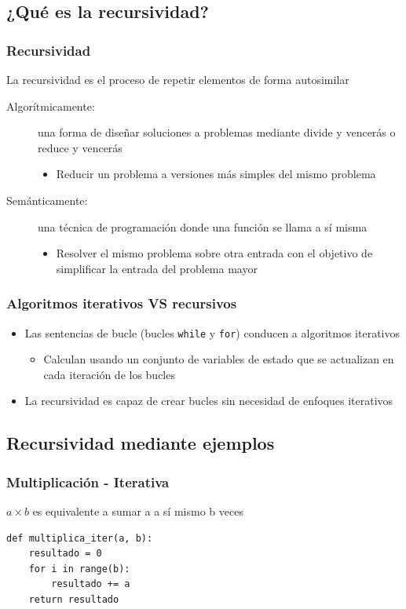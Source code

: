 \documentclass[11pt]{beamer}
\begin{document}
	\subsection{¿Qué es la recursividad?}
	\begin{frame}\frametitle{Recursividad}
	\begin{block}{}
	La recursividad es el proceso de repetir elementos de forma autosimilar
	\end{block}
	\begin{description}
	\item[Algorítmicamente:] una forma de diseñar soluciones a problemas mediante divide y vencerás o reduce y vencerás
	\begin{itemize}
	\item Reducir un problema a versiones más simples del mismo problema
	\end{itemize}
	\item[Semánticamente:] una técnica de programación donde una función se llama a sí misma
	\begin{itemize}
	\item Resolver el mismo problema sobre otra entrada con el objetivo de simplificar la entrada del problema mayor
	\end{itemize}
	\end{description}
	\end{frame}

	\begin{frame}\frametitle{Algoritmos iterativos VS recursivos}
	\begin{itemize}
	\item Las sentencias de bucle (bucles \texttt{while} y \texttt{for}) conducen a algoritmos iterativos
	\begin{itemize}
	\item Calculan usando un conjunto de variables de estado que se actualizan en cada iteración de los bucles
	\end{itemize}
	\item La recursividad es capaz de crear bucles sin necesidad de enfoques iterativos
	\end{itemize}
	\end{frame}

	\subsection{Recursividad mediante ejemplos}

	\begin{frame}[fragile]\frametitle{Multiplicación - Iterativa}
	\begin{block}{}
	\centering $a \times b$ es equivalente a sumar a a sí mismo b veces
	\end{block}
	\begin{lstlisting}
def multiplica_iter(a, b):
	resultado = 0
	for i in range(b):
		resultado += a
	return resultado
\end{lstlisting}
	\end{frame}
\end{document}
